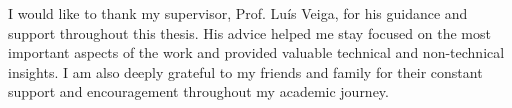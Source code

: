 
I would like to thank my supervisor, Prof. Luís Veiga, for his guidance and support throughout this thesis. His advice helped me stay focused on the most important aspects of the work and provided valuable technical and non-technical insights. I am also deeply grateful to my friends and family for their constant support and encouragement throughout my academic journey.
